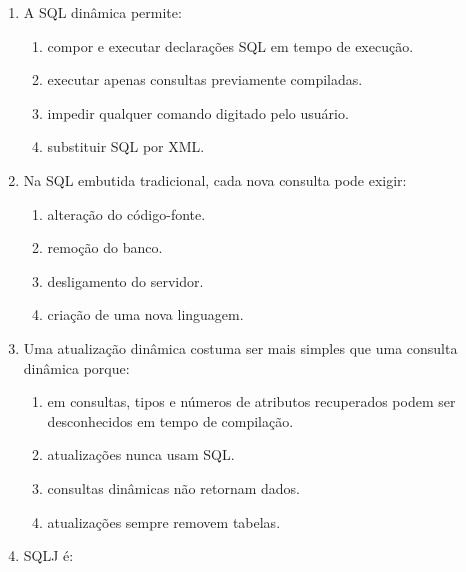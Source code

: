 \documentclass[12pt,a4paper]{article}
\begin{document}
\begin{enumerate}[label=\textbf{Q\arabic*.}]
\begin{enumerate}[label=\alph*)]
    \item o processamento da consulta foi completado.
    \item uma tabela foi removida.
    \item uma conexão foi aberta.
    \item uma senha foi criptografada.
\end{enumerate}

\item A SQL dinâmica permite:

\begin{enumerate}[label=\alph*)]
    \item compor e executar declarações SQL em tempo de execução.
    \item executar apenas consultas previamente compiladas.
    \item impedir qualquer comando digitado pelo usuário.
    \item substituir SQL por XML.
\end{enumerate}

\item Na SQL embutida tradicional, cada nova consulta pode exigir:

\begin{enumerate}[label=\alph*)]
    \item alteração do código-fonte.
    \item remoção do banco.
    \item desligamento do servidor.
    \item criação de uma nova linguagem.
\end{enumerate}

\item Uma atualização dinâmica costuma ser mais simples que uma consulta dinâmica porque:

\begin{enumerate}[label=\alph*)]
    \item em consultas, tipos e números de atributos recuperados podem ser desconhecidos em tempo de compilação.
    \item atualizações nunca usam SQL.
    \item consultas dinâmicas não retornam dados.
    \item atualizações sempre removem tabelas.
\end{enumerate}

\item SQLJ é:


\end{enumerate}
\end{document}
